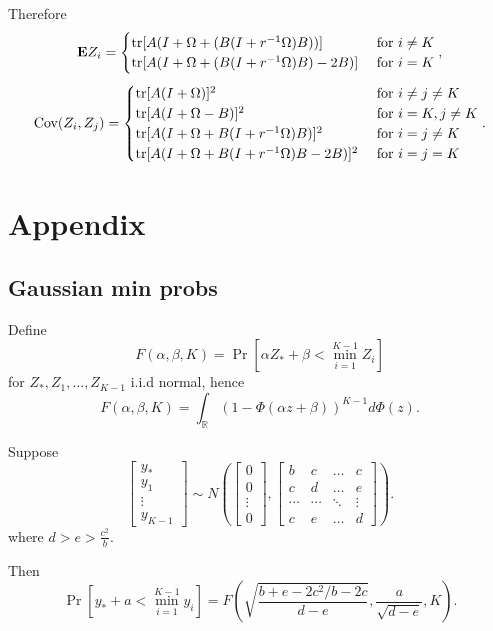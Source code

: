 \documentclass[12pt]{article}
\begin{document}
Therefore
\[
\textbf{E} Z_i = \begin{cases}
\text{tr}[A (I + \Omega + (B(I + r^{-1}\Omega) B))] & \text{ for }i \neq K\\
\text{tr}[A (I + \Omega + (B(I + r^{-1}\Omega) B) - 2B)] & \text{ for }i = K
\end{cases},
\]
\[
\text{Cov}(Z_i, Z_j) = 
\begin{cases}
\text{tr}[A (I + \Omega)]^2 & \text{ for }i \neq j \neq K\\
\text{tr}[A (I + \Omega - B)]^2 & \text{ for }i =K, j \neq K\\
\text{tr}[A (I + \Omega + B(I + r^{-1}\Omega) B)]^2 & \text{ for }i=j \neq K\\
\text{tr}[A (I + \Omega + B(I + r^{-1}\Omega) B - 2B)]^2 & \text{ for }i=j=K
\end{cases}.
\]

\section{Appendix}

\subsection{Gaussian min probs}

Define
\[
F(\alpha,\beta, K) = \Pr[\alpha Z_* + \beta < \min_{i=1}^{K-1} Z_i]
\]
for $Z_*, Z_1,\hdots, Z_{K-1}$ i.i.d normal,
hence
\[
F(\alpha, \beta, K) = \int_{\mathbb{R}} (1 - \Phi(\alpha z + \beta))^{K-1} d\Phi(z).
\]

Suppose
\[
\begin{bmatrix}
y_* \\
y_1 \\
\vdots \\
y_{K-1}
\end{bmatrix}
\sim
N\left(
\begin{bmatrix}
0\\
0\\
\vdots \\
0
\end{bmatrix},
\begin{bmatrix}
b & c & \hdots & c\\
c & d & \hdots & e\\
\cdots & \cdots & \ddots & \vdots\\
c & e & \hdots & d
\end{bmatrix}
\right).
\]
where $d > e > \frac{c^2}{b}$.

Then
\[
\Pr[y_* + a < \min_{i=1}^{K-1} y_i] = F\left(\sqrt{\frac{b + e - 2c^2/b - 2c}{d-e}}, \frac{a}{\sqrt{d-e}}, K\right).
\]
\end{document}
